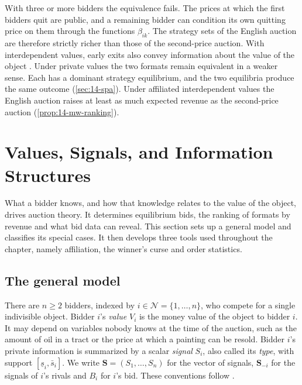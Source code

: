 \begin{remark}\label{rem:14-english-n3}
With three or more bidders the equivalence fails. The prices at which the first bidders quit are public,
and a remaining bidder can condition its own quitting price on them through the functions $\beta_{ik}$. The
strategy sets of the English auction are therefore strictly richer than those of the second-price auction.
With interdependent values, early exits also convey information about the value of the object
\citep[p.~1104]{MilgromWeber1982}. Under private values the two formats remain equivalent in a weaker sense.
Each has a dominant strategy equilibrium, and the two equilibria produce the same outcome
(\cref{sec:14-spa}). Under affiliated interdependent values the English auction raises at least as
much expected revenue as the second-price auction (\cref{prop:14-mw-ranking}).
\end{remark}

\section{Values, Signals, and Information Structures}\label{sec:14-info}

What a bidder knows, and how that knowledge relates to the value of the object, drives auction theory. It
determines equilibrium bids, the ranking of formats by revenue and what bid data can reveal. This section
sets up a general model and classifies its special cases. It then develops three tools used throughout the
chapter, namely affiliation, the winner's curse and order statistics.

\subsection{The general model}\label{sec:14-info-model}

There are $n\ge 2$ bidders, indexed by $i\in\mathcal{N}=\{1,\dots,n\}$, who compete for a single indivisible
object. Bidder $i$'s \emph{value} $V_i$ is the money value of the object to bidder $i$. It may depend on
variables nobody knows at the time of the auction, such as the amount of oil in a tract or the price at
which a painting can be resold. Bidder $i$'s private information is summarized by a scalar \emph{signal}
$S_i$, also called its \emph{type}, with support $[\underline s_i,\bar s_i]$. We write
$\bm S=(S_1,\dots,S_n)$ for the vector of signals, $\bm S_{-i}$ for the signals of $i$'s rivals and $B_i$
for $i$'s bid. These conventions follow \citet[Section~2.1]{AtheyHaile2007}.

